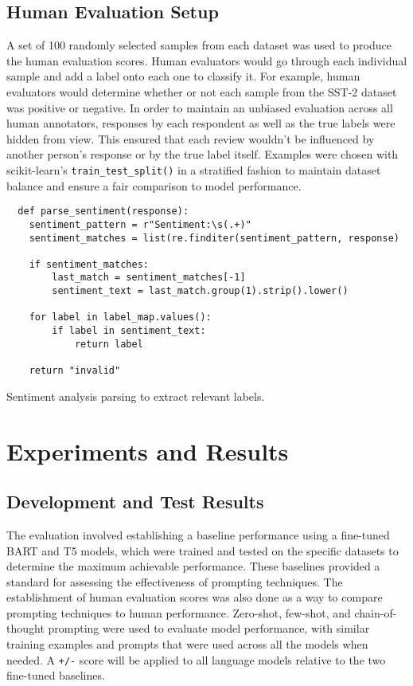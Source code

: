 \documentclass[twocolumn]{article}
\newcommand{\tcode}[1]{\texttt{#1}}
\begin{document}
\subsection{Human Evaluation Setup}
A set of 100 randomly selected samples from each dataset was used to produce the human evaluation scores. Human evaluators would go through each individual sample and add a label onto each one to classify it. For example, human evaluators would determine whether or not each sample from the SST-2 dataset was positive or negative. In order to maintain an unbiased evaluation across all human annotators, responses by each respondent as well as the true labels were hidden from view. This ensured that each review wouldn’t be influenced by another person’s response or by the true label itself. Examples were chosen with scikit-learn’s \verb|train_test_split()| in a stratified fashion to maintain dataset balance and ensure a fair comparison to model performance.

\begin{listing}[ht]
\begin{verbatim}
  def parse_sentiment(response):
    sentiment_pattern = r"Sentiment:\s(.+)"
    sentiment_matches = list(re.finditer(sentiment_pattern, response)

    if sentiment_matches:
        last_match = sentiment_matches[-1]
        sentiment_text = last_match.group(1).strip().lower()

    for label in label_map.values():
        if label in sentiment_text:
            return label

    return "invalid"
\end{verbatim}
\caption{Sentiment analysis parsing to extract relevant labels.}
\label{lst:eg}
\end{listing}

\section{Experiments and Results}

\subsection{Development and Test Results}

The evaluation involved establishing a baseline performance using a fine-tuned BART and T5 models, which were trained and tested on the specific datasets to determine the maximum achievable performance. These baselines provided a standard for assessing the effectiveness of prompting techniques. The establishment of human evaluation scores was also done as a way to compare prompting techniques to human performance. Zero-shot, few-shot, and chain-of-thought prompting were used to evaluate model performance, with similar training examples and prompts that were used across all the models when needed. A \tcode{+/-} score will be applied to all language models relative to the two fine-tuned baselines.
\end{document}
